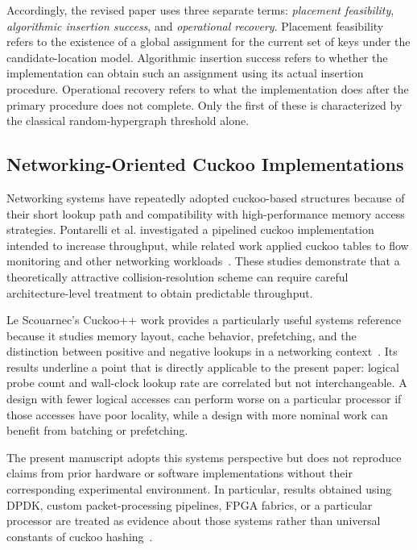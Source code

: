 \documentclass[conference]{IEEEtran}
\begin{document}
Accordingly, the revised paper uses three separate terms: \emph{placement feasibility}, \emph{algorithmic insertion success}, and \emph{operational recovery}. Placement feasibility refers to the existence of a global assignment for the current set of keys under the candidate-location model. Algorithmic insertion success refers to whether the implementation can obtain such an assignment using its actual insertion procedure. Operational recovery refers to what the implementation does after the primary procedure does not complete. Only the first of these is characterized by the classical random-hypergraph threshold alone.

\subsection{Networking-Oriented Cuckoo Implementations}

Networking systems have repeatedly adopted cuckoo-based structures because of their short lookup path and compatibility with high-performance memory access strategies. Pontarelli et al. investigated a pipelined cuckoo implementation intended to increase throughput, while related work applied cuckoo tables to flow monitoring and other networking workloads~\cite{pontarelli2016parallel,pontarelli2016cuckoocache}. These studies demonstrate that a theoretically attractive collision-resolution scheme can require careful architecture-level treatment to obtain predictable throughput.

Le Scouarnec's Cuckoo++ work provides a particularly useful systems reference because it studies memory layout, cache behavior, prefetching, and the distinction between positive and negative lookups in a networking context~\cite{lescouarnec2018cuckoopp}. Its results underline a point that is directly applicable to the present paper: logical probe count and wall-clock lookup rate are correlated but not interchangeable. A design with fewer logical accesses can perform worse on a particular processor if those accesses have poor locality, while a design with more nominal work can benefit from batching or prefetching.

The present manuscript adopts this systems perspective but does not reproduce claims from prior hardware or software implementations without their corresponding experimental environment. In particular, results obtained using DPDK, custom packet-processing pipelines, FPGA fabrics, or a particular processor are treated as evidence about those systems rather than universal constants of cuckoo hashing~\cite{lescouarnec2018cuckoopp,megias2025minimizing}.
\end{document}
